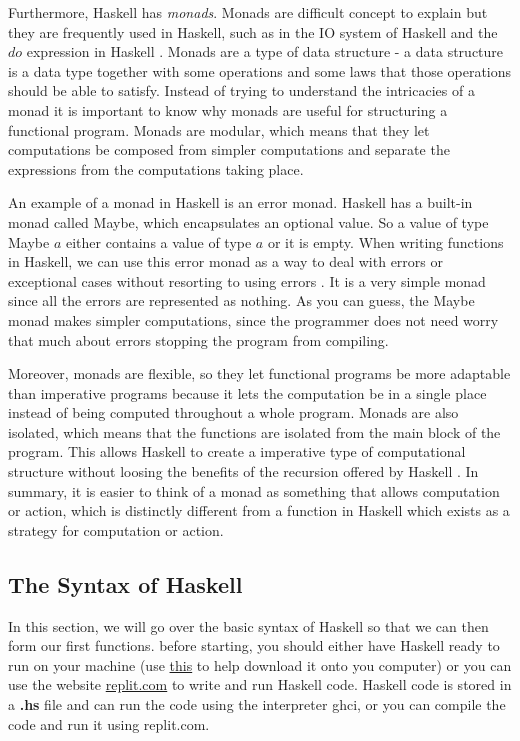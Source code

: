 \documentclass{article}
\begin{document}
\vspace{\baselineskip}
Furthermore, Haskell has \textit{monads}. Monads are difficult concept to explain but they are frequently used in Haskell, such as in the IO system of Haskell and the $do$ expression in Haskell \cite{4}. Monads are a type of data structure - a data structure is a data type together with some operations and some laws that those operations should be able to satisfy. Instead of trying to understand the intricacies of a monad it is important to know why monads are useful for structuring a functional program. Monads are modular, which means that they let computations be composed from simpler computations and separate the expressions from the computations taking place. 

\vspace{\baselineskip}
An example of a monad in Haskell is an error monad. Haskell has a built-in monad called Maybe, which encapsulates an optional value. So a value of type Maybe $a$ either contains a value of type $a$ or it is empty. When writing functions in Haskell, we can use this error monad as a way to deal with errors or exceptional cases without resorting to using errors \cite{19}. It is a very simple monad since all the errors are represented as nothing. As you can guess, the Maybe monad makes simpler computations, since the programmer does not need worry that much about errors stopping the program from compiling.

\vspace{\baselineskip}
Moreover, monads are flexible, so they let functional programs be more adaptable than imperative programs because it lets the computation be in a single place instead of being computed throughout a whole program. Monads are also isolated, which means that the functions are isolated from the main block of the program. This allows Haskell to create a imperative type of computational structure without loosing the benefits of the recursion offered by Haskell \cite{5}. In summary, it is easier to think of a monad as something that allows computation or action, which is distinctly different from a function in Haskell which exists as a strategy for computation or action.

\subsection{The Syntax of Haskell}
In this section, we will go over the basic syntax of Haskell so that we can then form our first functions. before starting, you should either have Haskell ready to run on your machine (use \href{https://hackmd.io/@alexhkurz/Hk86XnCzD}{this} to help download it onto you computer) or you can use the website \href{https://replit.com/~}{replit.com} to write and run Haskell code. Haskell code is stored in a \textbf{.hs} file and can run the code using the interpreter ghci, or you can compile the code and run it using replit.com.
\end{document}
